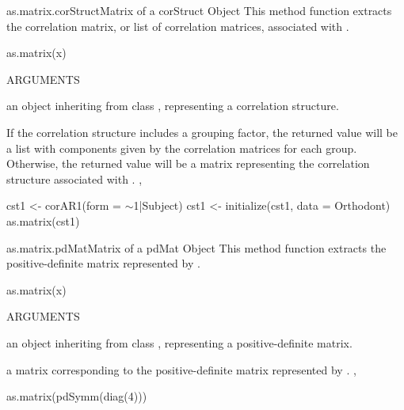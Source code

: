 \documentclass[pdftex]{article} \usepackage{url,graphicx}
\renewcommand{\Twiddle}{\mbox{\(\sim\)}}
\begin{document}
\begin{Helpfile}{as.matrix.corStruct}{Matrix of a corStruct Object}
This method function extracts the correlation matrix, or list of
correlation matrices, associated with .
\begin{Example}
as.matrix(x)
\end{Example}
\begin{Argument}{ARGUMENTS}
\item[\Co{x:}]
an object inheriting from class ,
representing a correlation structure.
\end{Argument}
If the correlation structure includes a grouping factor, the returned
value will be a list with components given by the correlation
matrices for each group. Otherwise, the returned value will be a
matrix representing the correlation structure associated with
.
, 
\need 15pt
\vspace{-16pt} 
\begin{Example}
cst1 <- corAR1(form = \Twiddle 1|Subject)
cst1 <- initialize(cst1, data = Orthodont)
as.matrix(cst1)
\end{Example}
\end{Helpfile}
\begin{Helpfile}{as.matrix.pdMat}{Matrix of a pdMat Object}
This method function extracts the positive-definite matrix represented
by .
\begin{Example}
as.matrix(x)
\end{Example}
\begin{Argument}{ARGUMENTS}
\item[\Co{x:}]
an object inheriting from class , representing a
positive-definite matrix.
\end{Argument}
a matrix corresponding to the positive-definite matrix represented by
.
, 
\need 15pt
\vspace{-16pt} 
\begin{Example}
as.matrix(pdSymm(diag(4)))
\end{Example}
\end{Helpfile}
\end{document}
